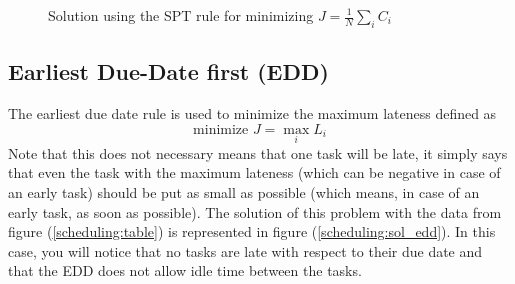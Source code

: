 \begin{figure}[h!]
    \centering
    \caption{\label{scheduling:sol_spt}Solution using the SPT rule for minimizing $J = \frac{1}{N}\sum_iC_i$}
\end{figure}

\subsection{Earliest Due-Date first (EDD)}

The earliest due date rule is used to minimize the maximum lateness defined as \[ \textrm{minimize } J = \max_i L_i \]
Note that this does not necessary means that one task will be late, it simply says that even the task with the maximum lateness (which can be negative in case of an early task) should be put as small as possible (which means, in case of an early task, as soon as possible). The solution of this problem with the data from figure (\ref{scheduling:table}) is represented in figure (\ref{scheduling:sol_edd}). In this case, you will notice that no tasks are late with respect to their due date and that the EDD does not allow idle time between the tasks. 


